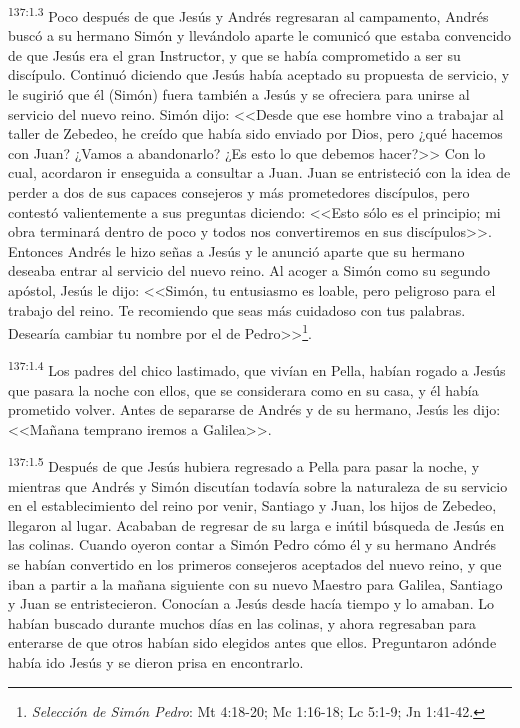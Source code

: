 \par 
\textsuperscript{137:1.3} Poco después de que Jesús y Andrés regresaran al campamento, Andrés buscó a su hermano Simón y llevándolo aparte le comunicó que estaba convencido de que Jesús era el gran Instructor, y que se había comprometido a ser su discípulo. Continuó diciendo que Jesús había aceptado su propuesta de servicio, y le sugirió que él (Simón) fuera también a Jesús y se ofreciera para unirse al servicio del nuevo reino. Simón dijo: <<Desde que ese hombre vino a trabajar al taller de Zebedeo, he creído que había sido enviado por Dios, pero ¿qué hacemos con Juan? ¿Vamos a abandonarlo? ¿Es esto lo que debemos hacer?>> Con lo cual, acordaron ir enseguida a consultar a Juan. Juan se entristeció con la idea de perder a dos de sus capaces consejeros y más prometedores discípulos, pero contestó valientemente a sus preguntas diciendo: <<Esto sólo es el principio; mi obra terminará dentro de poco y todos nos convertiremos en sus discípulos>>. Entonces Andrés le hizo señas a Jesús y le anunció aparte que su hermano deseaba entrar al servicio del nuevo reino. Al acoger a Simón como su segundo apóstol, Jesús le dijo: <<Simón, tu entusiasmo es loable, pero peligroso para el trabajo del reino. Te recomiendo que seas más cuidadoso con tus palabras. Desearía cambiar tu nombre por el de Pedro>>\footnote{\textit{Selección de Simón Pedro}: Mt 4:18-20; Mc 1:16-18; Lc 5:1-9; Jn 1:41-42.}.

\par 
\textsuperscript{137:1.4} Los padres del chico lastimado, que vivían en Pella, habían rogado a Jesús que pasara la noche con ellos, que se considerara como en su casa, y él había prometido volver. Antes de separarse de Andrés y de su hermano, Jesús les dijo: <<Mañana temprano iremos a Galilea>>.

\par 
\textsuperscript{137:1.5} Después de que Jesús hubiera regresado a Pella para pasar la noche, y mientras que Andrés y Simón discutían todavía sobre la naturaleza de su servicio en el establecimiento del reino por venir, Santiago y Juan, los hijos de Zebedeo, llegaron al lugar. Acababan de regresar de su larga e inútil búsqueda de Jesús en las colinas. Cuando oyeron contar a Simón Pedro cómo él y su hermano Andrés se habían convertido en los primeros consejeros aceptados del nuevo reino, y que iban a partir a la mañana siguiente con su nuevo Maestro para Galilea, Santiago y Juan se entristecieron. Conocían a Jesús desde hacía tiempo y lo amaban. Lo habían buscado durante muchos días en las colinas, y ahora regresaban para enterarse de que otros habían sido elegidos antes que ellos. Preguntaron adónde había ido Jesús y se dieron prisa en encontrarlo.

